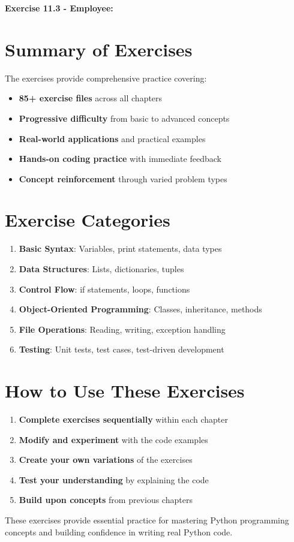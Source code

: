 \textbf{Exercise 11.3 - Employee:}


\section*{Summary of Exercises}
The exercises provide comprehensive practice covering:
\begin{itemize}
    \item \textbf{85+ exercise files} across all chapters
    \item \textbf{Progressive difficulty} from basic to advanced concepts
    \item \textbf{Real-world applications} and practical examples
    \item \textbf{Hands-on coding practice} with immediate feedback
    \item \textbf{Concept reinforcement} through varied problem types
\end{itemize}

\section*{Exercise Categories}
\begin{enumerate}
    \item \textbf{Basic Syntax}: Variables, print statements, data types
    \item \textbf{Data Structures}: Lists, dictionaries, tuples
    \item \textbf{Control Flow}: if statements, loops, functions
    \item \textbf{Object-Oriented Programming}: Classes, inheritance, methods
    \item \textbf{File Operations}: Reading, writing, exception handling
    \item \textbf{Testing}: Unit tests, test cases, test-driven development
\end{enumerate}

\section*{How to Use These Exercises}
\begin{enumerate}
    \item \textbf{Complete exercises sequentially} within each chapter
    \item \textbf{Modify and experiment} with the code examples
    \item \textbf{Create your own variations} of the exercises
    \item \textbf{Test your understanding} by explaining the code
    \item \textbf{Build upon concepts} from previous chapters
\end{enumerate}

These exercises provide essential practice for mastering Python programming concepts and building confidence in writing real Python code. 